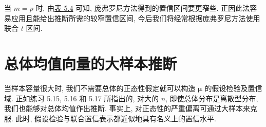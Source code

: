 当 $m=p$ 时, 由\hyperref[tab:5.4]{表 5.4} 可知, 庞弗罗尼方法得到的置信区间要更窄些. 正因此法容易应用且能给出推断所需的较窄置信区间, 今后我们将经常根据庞弗罗尼方法使用联合 $t$ 区间.

\section{总体均值向量的大样本推断}
\label{sec:5.5}

当样本容量很大时, 我们不需要总体的正态性假定就可以构造 $\boldsymbol{\mu}$ 的假设检验及置信域. 正如练习 5.15, 5.16 和 5.17 所指出的, 对大的 $n$, 即使总体分布是离散型分布, 我们也能够对总体均值作出推断. 事实上, 对正态性的严重偏离可通过大样本来克服. 此时, 假设检验与联合置信表示都近似地具有名义上的置信水平.
